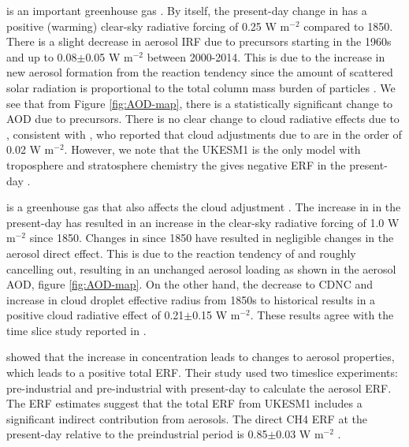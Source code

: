 is an important greenhouse gas \citep{forsterEarthEnergyBudget2021}. By itself, the present-day change in  has a positive (warming) clear-sky radiative forcing of 0.25 W m$^{-2}$ compared to 1850. There is a slight decrease in aerosol IRF due to  precursors starting in the 1960s and up to 0.08$\pm$0.05 W m$^{-2}$ between 2000-2014. This is due to the increase in new aerosol formation from the  reaction tendency since the amount of scattered solar radiation is proportional to the total column mass burden of particles \citep{nemesureDirectShortwaveForcing1995}. We see that from Figure \ref{fig:AOD-map}, there is a statistically significant change to AOD due to  precursors. There is no clear change to cloud radiative effects due to , consistent with \citet{skeieHistoricalTotalOzone2020}, who reported that cloud adjustments due to  are in the order of 0.02 W m$^{-2}$. However, we note that the UKESM1 is the only model with troposphere and stratosphere chemistry the gives negative ERF in the present-day \citet{skeieHistoricalTotalOzone2020}. 

 is a greenhouse gas that also affects the cloud adjustment \citep{oconnorApportionmentPreIndustrial2022}. The increase in  in the present-day has resulted in an increase in the clear-sky radiative forcing of 1.0 W m$^{-2}$ since 1850. Changes in  since 1850 have resulted in negligible changes in the aerosol direct effect. This is due to the reaction tendency of  and  roughly cancelling out, resulting in an unchanged aerosol loading as shown in the aerosol AOD, figure \ref{fig:AOD-map}. On the other hand, the decrease to CDNC and increase in cloud droplet effective radius from 1850s to historical  results in a positive cloud radiative effect of 0.21$\pm$0.15 W m$^{-2}$. These results agree with the time slice study reported in \citep{oconnorApportionmentPreIndustrial2022}.

\citet{oconnorApportionmentPreIndustrial2022} showed that the increase in  concentration leads to changes to aerosol properties, which leads to a positive total  ERF. Their study used two timeslice experiments: pre-industrial and pre-industrial with present-day  to calculate the aerosol ERF. The ERF estimates suggest that the total  ERF from UKESM1 includes a significant indirect contribution from aerosols. The direct CH4 ERF at the present-day relative to the preindustrial period is 0.85$\pm$0.03 W m$^{-2}$ \citep{oconnorAssessmentPreindustrialPresentday2021}.

